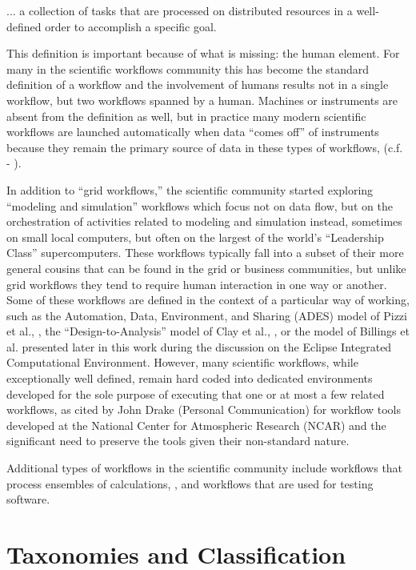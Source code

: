 \begin{displayquote}
... a collection of tasks that are processed on distributed resources in a
well-defined order to accomplish a specific goal.
\end{displayquote}

This definition is important because of what is missing: the human
element. For many in the scientific workflows community this has become
the standard definition of a workflow and the involvement of humans
results not in a single workflow, but two workflows spanned by a human.
Machines or instruments are absent from the definition as well, but in
practice many modern scientific workflows are launched automatically
when data ``comes off'' of instruments because they remain the primary
source of data in these types of workflows, (c.f. - \cite{megino_panda:_2015}).

In addition to ``grid workflows,'' the scientific community started
exploring ``modeling and simulation'' workflows which focus not on data
flow, but on the orchestration of activities related to modeling and
simulation instead, sometimes on small local computers, but often on the
largest of the world's ``Leadership Class'' supercomputers. These
workflows typically fall into a subset of their more general cousins
that can be found in the grid or business communities, but unlike grid
workflows they tend to require human interaction in one way or another.
Some of these workflows are defined in the context of a particular way
of working, such as the Automation, Data, Environment, and Sharing
(ADES) model of Pizzi et al., \cite{pizzi_aiida:_2016}, the
``Design-to-Analysis'' model of Clay et al., \cite{clay_incorporating_2015}, or
the model of Billings et al. presented later in this work during the
discussion on the Eclipse Integrated Computational Environment. However,
many scientific workflows, while exceptionally well defined, remain hard
coded into dedicated environments developed for the sole purpose of
executing that one or at most a few related workflows, as cited by John
Drake (Personal Communication) for workflow tools developed at the National
Center for Atmospheric Research (NCAR) and the significant need to preserve the
tools given their non-standard nature.

Additional types of workflows in the scientific community include
workflows that process ensembles of calculations, \cite{montoya_apex_2016},
and workflows that are used for testing software.

\section{Taxonomies and
Classification}\label{taxonomies-and-classification}

